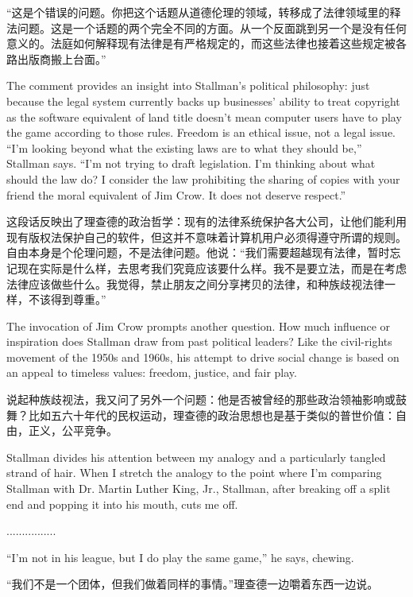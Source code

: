 \ifdefined\chs
“这是个错误的问题。你把这个话题从道德伦理的领域，转移成了法律领域里的释法问题。这是一个话题的两个完全不同的方面。从一个反面跳到另一个是没有任何意义的。法庭如何解释现有法律是有严格规定的，而这些法律也接着这些规定被各路出版商搬上台面。”
\fi

\ifdefined\eng
The comment provides an insight into Stallman's political philosophy: just because the legal system currently backs up businesses' ability to treat copyright as the software equivalent of land title doesn't mean computer users have to play the game according to those rules. Freedom is an ethical issue, not a legal issue. ``I'm looking beyond what the existing laws are to what they should be,'' Stallman says. ``I'm not trying to draft legislation. I'm thinking about what should the law do? I consider the law prohibiting the sharing of copies with your friend the moral equivalent of Jim Crow. It does not deserve respect.''
\fi

\ifdefined\chs
这段话反映出了理查德的政治哲学：现有的法律系统保护各大公司，让他们能利用现有版权法保护自己的软件，但这并不意味着计算机用户必须得遵守所谓的规则。自由本身是个伦理问题，不是法律问题。他说：“我们需要超越现有法律，暂时忘记现在实际是什么样，去思考我们究竟应该要什么样。我不是要立法，而是在考虑法律应该做些什么。我觉得，禁止朋友之间分享拷贝的法律，和种族歧视法律一样，不该得到尊重。”
\fi

\ifdefined\eng
The invocation of Jim Crow prompts another question. How much influence or inspiration does Stallman draw from past political leaders? Like the civil-rights movement of the 1950s and 1960s, his attempt to drive social change is based on an appeal to timeless values: freedom, justice, and fair play.
\fi

\ifdefined\chs
说起种族歧视法，我又问了另外一个问题：他是否被曾经的那些政治领袖影响或鼓舞？比如五六十年代的民权运动，理查德的政治思想也是基于类似的普世价值：自由，正义，公平竞争。
\fi

\ifdefined\eng
Stallman divides his attention between my analogy and a particularly tangled strand of hair. When I stretch the analogy to the point where I'm comparing Stallman with Dr. Martin Luther King, Jr., Stallman, after breaking off a split end and popping it into his mouth, cuts me off.
\fi

\ifdefined\chs
................
\fi

\ifdefined\eng
``I'm not in his league, but I do play the same game,'' he says, chewing.
\fi

\ifdefined\chs
“我们不是一个团体，但我们做着同样的事情。”理查德一边嚼着东西一边说。
\fi

